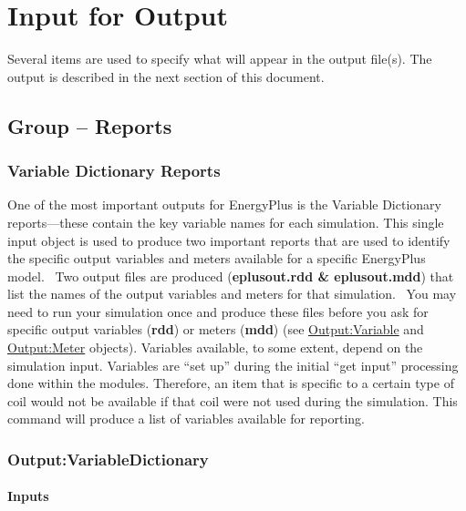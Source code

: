 \chapter{Input for Output}\label{input-for-output}

Several items are used to specify what will appear in the output file(s). The output is described in the next section of this document.

\section{Group -- Reports}\label{group-reports}

\subsection{Variable Dictionary Reports}\label{variable-dictionary-reports}

One of the most important outputs for EnergyPlus is the Variable Dictionary reports---these contain the key variable names for each simulation. This single input object is used to produce two important reports that are used to identify the specific output variables and meters available for a specific EnergyPlus model.~ Two output files are produced (\textbf{eplusout.rdd \& eplusout.mdd}) that list the names of the output variables and meters for that simulation.~ You may need to run your simulation once and produce these files before you ask for specific output variables (\textbf{rdd}) or meters (\textbf{mdd}) (see \hyperref[outputvariable]{Output:Variable} and \hyperref[outputmeter-and-outputmetermeterfileonly]{Output:Meter} objects). Variables available, to some extent, depend on the simulation input. Variables are ``set up'' during the initial ``get input'' processing done within the modules. Therefore, an item that is specific to a certain type of coil would not be available if that coil were not used during the simulation. This command will produce a list of variables available for reporting.

\subsection{Output:VariableDictionary}\label{output-variabledictionary}

\subsubsection{Inputs}


